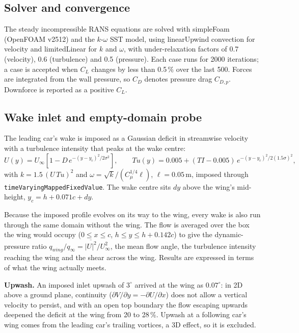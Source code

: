 \documentclass[11pt,a4paper]{article}
\begin{document}
\subsection{Solver and convergence}
The steady incompressible RANS equations are solved with simpleFoam (OpenFOAM v2512) and the $k$-$\omega$ SST model, using linearUpwind convection for velocity and limitedLinear for $k$ and $\omega$, with under-relaxation factors of 0.7 (velocity), 0.6 (turbulence) and 0.5 (pressure). Each case runs for 2000 iterations; a case is accepted when $C_L$ changes by less than 0.5\,\% over the last 500. Forces are integrated from the wall pressure, so $C_D$ denotes pressure drag $C_{D,p}$. Downforce is reported as a positive $C_L$.

\subsection{Wake inlet and empty-domain probe}
The leading car's wake is imposed as a Gaussian deficit in streamwise velocity with a turbulence intensity that peaks at the wake centre:
\begin{equation}
U(y) = U_\infty\left[1 - D\,e^{-(y-y_c)^2/2\sigma^2}\right],\qquad
Tu(y) = 0.005 + (TI - 0.005)\,e^{-(y-y_c)^2/2(1.5\sigma)^2},
\end{equation}
with $k = 1.5\,(U\,Tu)^2$ and $\omega = \sqrt{k}/(C_\mu^{1/4}\ell)$, $\ell = 0.05$\,m, imposed through \texttt{timeVaryingMappedFixedValue}. The wake centre sits $dy$ above the wing's mid-height, $y_c = h + 0.071c + dy$.

Because the imposed profile evolves on its way to the wing, every wake is also run through the same domain without the wing. The flow is averaged over the box the wing would occupy ($0 \le x \le c$, $h \le y \le h + 0.142c$) to give the dynamic-pressure ratio $q_{wing}/q_\infty = \overline{|U|^2}/U_\infty^2$, the mean flow angle, the turbulence intensity reaching the wing and the shear across the wing. Results are expressed in terms of what the wing actually meets.

\textbf{Upwash.} An imposed inlet upwash of $3^\circ$ arrived at the wing as $0.07^\circ$: in 2D above a ground plane, continuity ($\partial V/\partial y = -\partial U/\partial x$) does not allow a vertical velocity to persist, and with an open top boundary the flow escaping upwards deepened the deficit at the wing from 20 to 28\,\%. Upwash at a following car's wing comes from the leading car's trailing vortices, a 3D effect, so it is excluded.
\end{document}
